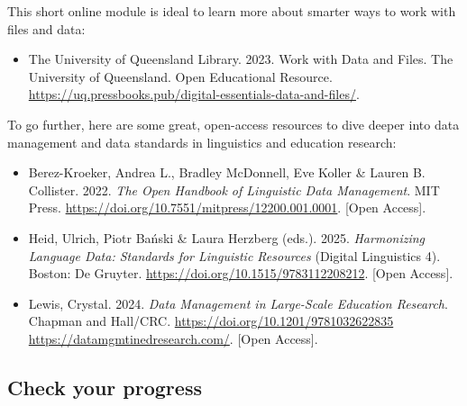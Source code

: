 \documentclass[
  letterpaper,
  DIV=11,
  numbers=noendperiod]{scrreprt}
\providecommand{\tightlist}{%
  \setlength{\itemsep}{0pt}\setlength{\parskip}{0pt}}
\begin{document}
\begin{tcolorbox}[enhanced jigsaw, arc=.35mm, bottomrule=.15mm, bottomtitle=1mm, breakable, colback=white, colbacktitle=quarto-callout-note-color!10!white, colframe=quarto-callout-note-color-frame, coltitle=black, left=2mm, leftrule=.75mm, opacityback=0, opacitybacktitle=0.6, rightrule=.15mm, title=\textcolor{quarto-callout-note-color}{\faInfo}\hspace{0.5em}{Going further \emoji{rocket}}, titlerule=0mm, toprule=.15mm, toptitle=1mm]

This short online module is ideal to learn more about smarter ways to
work with files and data:

\begin{itemize}
\tightlist
\item
  The University of Queensland Library. 2023. Work with Data and Files.
  The University of Queensland. Open Educational Resource.
  \url{https://uq.pressbooks.pub/digital-essentials-data-and-files/}.
\end{itemize}

To go further, here are some great, open-access resources to dive deeper
into data management and data standards in linguistics and education
research:

\begin{itemize}
\item
  Berez-Kroeker, Andrea L., Bradley McDonnell, Eve Koller \& Lauren B.
  Collister. 2022. \emph{The Open Handbook of Linguistic Data
  Management}. MIT Press.
  \url{https://doi.org/10.7551/mitpress/12200.001.0001}. {[}Open
  Access{]}.
\item
  Heid, Ulrich, Piotr Bański \& Laura Herzberg (eds.). 2025.
  \emph{Harmonizing Language Data: Standards for Linguistic Resources}
  (Digital Linguistics 4). Boston: De Gruyter.
  \url{https://doi.org/10.1515/9783112208212}. {[}Open Access{]}.
\item
  Lewis, Crystal. 2024. \emph{Data Management in Large-Scale Education
  Research}. Chapman and Hall/CRC.
  \url{https://doi.org/10.1201/9781032622835}
  \url{https://datamgmtinedresearch.com/}. {[}Open Access{]}.
\end{itemize}

\end{tcolorbox}

\subsection*{Check your progress}\label{check-your-progress-5}
\end{document}
